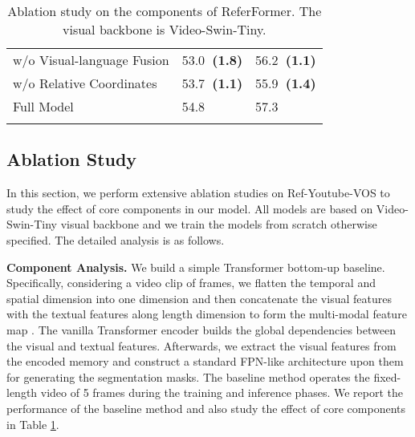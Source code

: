 \documentclass[10pt,twocolumn,letterpaper]{article}
\newcommand{\negacc}[1]{{\bf \fontsize{8.0}{42}\selectfont \color{myred}~(#1)}}
\newcommand{\myparagraph}[1]{{\vspace{.5em} \noindent \bf #1}}
\begin{document}
{\begin{table}[t]
\begin{center}
\begin{tabular}{l | l l }
\arrayrulecolor{white}\hline
\arrayrulecolor{black}\hline
\arrayrulecolor{white}\hline

w/o Visual-language Fusion & 53.0\negacc{1.8} & 56.2\negacc{1.1} \\
w/o Relative Coordinates & 53.7\negacc{1.1} & 55.9\negacc{1.4} \\


\arrayrulecolor{white}\hline
\arrayrulecolor{black}\hline
\arrayrulecolor{white}\hline

Full Model & 54.8 & 57.3 \\

\arrayrulecolor{white}\hline
\arrayrulecolor{black}\hline
\arrayrulecolor{white}\hline


\end{tabular}     \end{center}
    \vspace{-4mm}
    \caption{Ablation study on the components of ReferFormer. The visual backbone is Video-Swin-Tiny.}
    \label{tab:ab_component}
    \vspace{-5mm}
\end{table}




\subsection{Ablation Study}

In this section, we perform extensive ablation studies on Ref-Youtube-VOS to study the effect of core components in our model. All models are based on Video-Swin-Tiny visual backbone and we train the models from scratch otherwise specified. The detailed analysis is as follows.



\myparagraph{Component Analysis.} We build a simple Transformer bottom-up baseline. Specifically, considering a video clip of  frames, we flatten the temporal and spatial dimension into one dimension and then concatenate the visual features with the textual features along length dimension to form the multi-modal feature map . The vanilla Transformer encoder builds the global dependencies between the visual and textual features. Afterwards, we extract the visual features from the encoded memory and construct a standard FPN-like architecture upon them for generating the segmentation masks. The baseline method operates the fixed-length video of 5 frames during the training and inference phases. We report the performance of the baseline method and also study the effect of core components in Table \ref{tab:ab_component}. 

}
\end{document}

